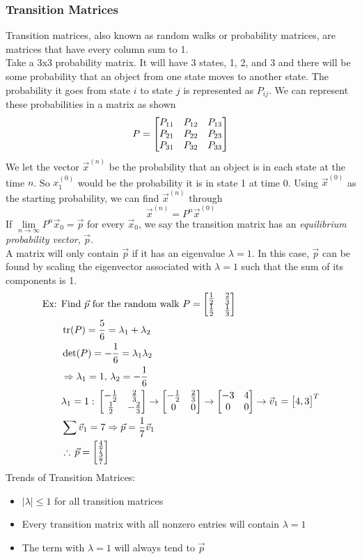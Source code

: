 \documentclass[11pt, fleqn]{article}
\begin{document}
\subsubsection{Transition Matrices}
Transition matrices, also known as random walks or probability matrices, are matrices that have every column sum to 1.\\
Take a 3x3 probability matrix. It will have 3 states, 1, 2, and 3 and there will be some probability that an object from one state moves to another state. The probability it goes from state $i$ to state $j$ is represented as $P_{ij}$. We can represent these probabilities in a matrix as shown
$$P=\matrixx{P_{11}&P_{12}&P_{13}\\P_{21}&P_{22}&P_{23}\\P_{31}&P_{32}&P_{33}}$$
We let the vector $\vec{x}^{(n)}$ be the probability that an object is in each state at the time $n$. So $x_1^{(0)}$ would be the probability it is in state 1 at time 0. Using $\vec{x}^{(0)}$ as the starting probability, we can find $\vec{x}^{(n)}$ through
$$\vec{x}^{(n)}=P^n\vec{x}^{(0)}$$
If $\lim\limits_{n\to\infty}P^n\vec{x}_0=\vec{p}$ for every $\vec{x}_0$, we say the transition matrix has an \textit{equilibrium probability vector}, $\vec{p}$.\\
A matrix will only contain $\vec{p}$ if it has an eigenvalue $\lambda=1$. In this case, $\vec{p}$ can be found by scaling the eigenvector associated with $\lambda=1$ such that the sum of its components is 1.
\begin{align*}
    \text{Ex: }&\text{Find $\vec{p}$ for the random walk }P=\matrixx{\frac{1}{2}&\frac{2}{3}\\\frac{1}{2}&\frac{1}{3}}\\
    &\trace(P)=\frac{5}{6}=\lambda_1+\lambda_2\\
    &\det(P)=-\frac{1}{6}=\lambda_1\lambda_2\\
    &\Ra \lambda_1=1,\,\lambda_2=-\frac{1}{6}\\
    &\lambda_1=1:\,\matrixx{-\frac{1}{2}&\frac{2}{3}\\\frac{1}{2}&-\frac{2}{3}}\to\matrixx{-\frac{1}{2}&\frac{2}{3}\\0&0}\to\matrixx{-3&4\\0&0}\to\vec{v}_1=\matrixx{4,3}^T\\
    &\sum\vec{v}_1=7\Ra\vec{p}=\frac{1}{7}\vec{v}_1\\
    &\therefore\,\vec{p}=\matrixx{\frac{4}{7}\\\frac{3}{7}}
\end{align*}
Trends of Transition Matrices:
\begin{itemize}
    \item $|\lambda|\leq 1$ for all transition matrices
    \item Every transition matrix with all nonzero entries will contain $\lambda=1$
    \item The term with $\lambda=1$ will always tend to $\vec{p}$
\end{itemize}
\end{document}

